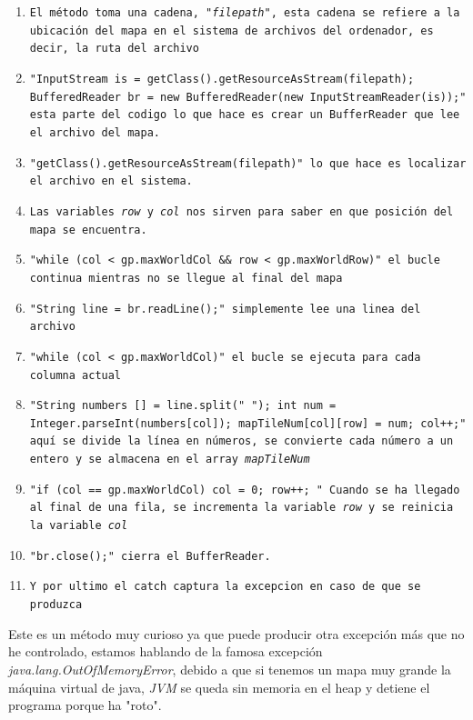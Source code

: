 \documentclass[a4paper]{article}
\begin{document}
\begin{enumerate}
    \item \texttt{El método toma una cadena, \textit{"filepath"}, esta cadena se refiere a la ubicación del mapa en el sistema de archivos del ordenador, es decir, la ruta del archivo}
    \item \texttt{"InputStream is = getClass().getResourceAsStream(filepath); BufferedReader br = new BufferedReader(new InputStreamReader(is));" esta parte del codigo lo que hace es crear un BufferReader que lee el archivo del mapa.}
    \item \texttt{"getClass().getResourceAsStream(filepath)" lo que hace es localizar el archivo en el sistema.}
    \item \texttt{Las variables \textit{row} y \textit{col} nos sirven para saber en que posición del mapa se encuentra.}
    \item \texttt{"while (col < gp.maxWorldCol \&\& row < gp.maxWorldRow)" el bucle continua mientras no se llegue al final del mapa}
    \item \texttt{"String line = br.readLine();" simplemente lee una linea del archivo}
    \item \texttt{"while (col < gp.maxWorldCol)" el bucle se ejecuta para cada columna actual}
    \item \texttt{"String numbers [] = line.split(" "); int num = Integer.parseInt(numbers[col]); mapTileNum[col][row] = num; col++;" aquí se divide la línea en números, se convierte cada número a un entero y se almacena en el array \textit{mapTileNum}}
    \item \texttt{"if (col == gp.maxWorldCol){ col = 0; row++; }" Cuando se ha llegado al final de una fila, se incrementa la variable \textit{row} y se reinicia la variable \textit{col}}
    \item \texttt{"br.close();" cierra el BufferReader.}
    \item \texttt{Y por ultimo el catch captura la excepcion en caso de que se produzca}
\end{enumerate}
Este es un método muy curioso ya que puede producir otra excepción más que no he controlado, estamos hablando de la famosa excepción \textit{java.lang.OutOfMemoryError}, debido a que si tenemos un mapa muy grande
la máquina virtual de java, \textit{JVM} se queda sin memoria en el heap y detiene el programa porque ha "roto".
\clearpage
\end{document}
